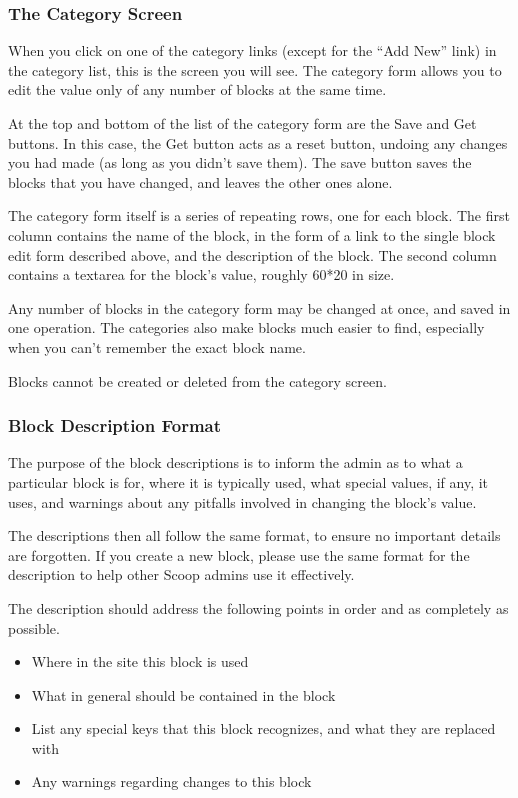 \subsubsection{The Category Screen}

 When you click on one of the category links (except for the ``Add New'' link) in the category list, this is the screen you will see. The category form allows you to edit the value only of any number of blocks at the same time.

At the top and bottom of the list of the category form are the Save and Get buttons. In this case, the Get button acts as a reset button, undoing any changes you had made (as long as you didn't save them). The save button saves the blocks that you have changed, and leaves the other ones alone.

The category form itself is a series of repeating rows, one for each block. The first column contains the name of the block, in the form of a link to the single block edit form described above, and the description of the block. The second column contains a textarea for the block's value, roughly 60*20 in size.

Any number of blocks in the category form may be changed at once, and saved in one operation. The categories also make blocks much easier to find, especially when you can't remember the exact block name.

Blocks cannot be created or deleted from the category screen.

\subsubsection{Block Description Format}
\label{blocks-description-format}

The purpose of the block descriptions is to inform the admin as to what a particular block is for, where it is typically used, what special values, if any, it uses, and warnings about any pitfalls involved in changing the block's value.

The descriptions then all follow the same format, to ensure no important details are forgotten. If you create a new block, please use the same format for the description to help other Scoop admins use it effectively.

The description should address the following points in order and as completely as possible.

\begin{itemize}
\item Where in the site this block is used
\item What in general should be contained in the block
\item List any special keys that this block recognizes, and what they are replaced with
\item Any warnings regarding changes to this block
\end{itemize}

